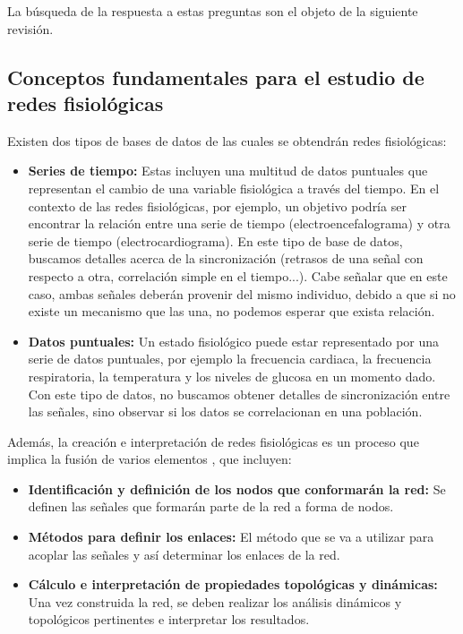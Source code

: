 \documentclass[twoside,twocolumn]{article}
\begin{document}
La búsqueda de la respuesta a estas preguntas son el objeto de la siguiente revisión.

\subsection{Conceptos fundamentales para el estudio de redes fisiológicas}
Existen dos tipos de bases de datos de las cuales se obtendrán redes fisiológicas:
\begin{itemize}
  \item \textbf{Series de tiempo:} Estas incluyen una multitud de datos puntuales que representan el cambio de una variable fisiológica a través del tiempo.
  En el contexto de las redes fisiológicas, por ejemplo, un objetivo podría ser encontrar la relación entre una serie de tiempo (electroencefalograma) y otra serie de tiempo (electrocardiograma).
  En este tipo de base de datos, buscamos detalles acerca de la sincronización (retrasos de una señal con respecto a otra, correlación simple en el tiempo...).
  Cabe señalar que en este caso, ambas señales deberán provenir del mismo individuo, debido a que si no existe un mecanismo que las una, no podemos esperar que exista relación\cite{bashan2012network}.
  \item \textbf{Datos puntuales:} Un estado fisiológico puede estar representado por una serie de datos puntuales, por ejemplo la frecuencia cardiaca, la frecuencia respiratoria, la temperatura y los niveles de glucosa en un momento dado.
  Con este tipo de datos, no buscamos obtener detalles de sincronización entre las señales, sino observar si los datos se correlacionan en una población\cite{barajas2021physiological}.
\end{itemize}
Además, la creación e interpretación de redes fisiológicas es un proceso que implica la fusión de varios elementos \cite{barajas2021sex}, que incluyen:
\begin{itemize}
  \item \textbf{Identificación y definición de los nodos que conformarán la red:} Se definen las señales que formarán parte de la red a forma de nodos.
  \item \textbf{Métodos para definir los enlaces:} El método que se va a utilizar para acoplar las señales y así determinar los enlaces de la red.
  \item \textbf{Cálculo e interpretación de propiedades topológicas y dinámicas:} Una vez construida la red, se deben realizar los análisis dinámicos y topológicos pertinentes e interpretar los resultados.
\end{itemize}
\end{document}
